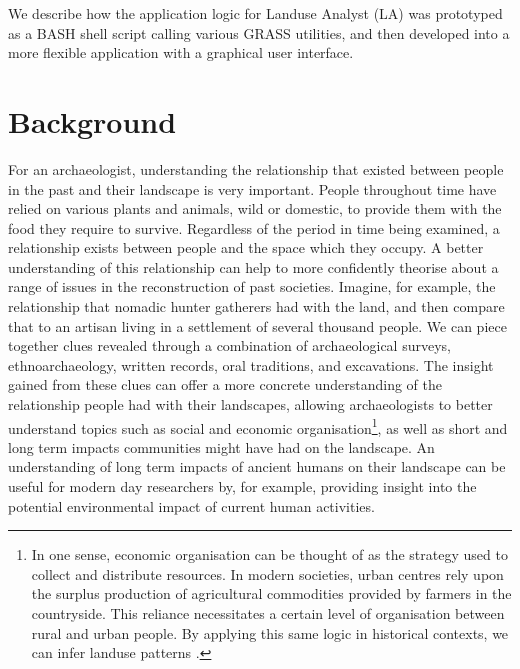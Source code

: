 We describe how the application logic for Landuse Analyst (LA) was prototyped as
a
BASH shell script calling various GRASS utilities, and then developed into a
more flexible application with a graphical user interface.

\section{Background} \label{sec:Background} For an archaeologist, understanding
the relationship that existed between people in the past and their landscape is
very important.  People throughout time have relied on various plants and
animals, wild or domestic, to provide them with the food they require to
survive.  Regardless of the period in time being examined, a relationship
exists between people and the space which they occupy.  A better understanding
of this relationship can help to more confidently theorise about a range of
issues in the reconstruction of past societies.  Imagine, for example, the
relationship that nomadic hunter gatherers had with the land, and then compare
that to  an artisan living in a settlement of several thousand people.  We can
piece together clues revealed through a combination of archaeological surveys,
ethnoarchaeology, written records, oral traditions, and excavations. The
insight gained from these clues can offer a more concrete understanding of the
relationship people had with their landscapes, allowing archaeologists to
better understand topics such as social and economic organisation\footnote{In
one sense, economic organisation can be thought of as the strategy used to
collect and distribute resources.  In modern societies, urban centres rely upon
the surplus production of agricultural commodities provided by farmers in the
countryside.  This reliance necessitates a certain level of organisation
between rural and urban people.  By applying this same logic in historical
contexts, we can infer landuse patterns .}, as well as short and long term
impacts communities might have had on the landscape.  An understanding of long
term impacts of ancient humans on their landscape can be useful for modern day
researchers by, for example, providing insight into the potential environmental
impact of
current human activities.

